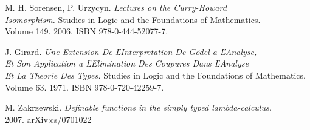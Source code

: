\documentclass{article}[12pt]
\begin{document}
\begin{thebibliography}{}
    M. H. Sorensen, P. Urzycyn. \textit{Lectures on the Curry-Howard \\ Isomorphism.}
    Studies in Logic and the Foundations of Mathematics. \\ Volume 149. 2006. ISBN
    978-0-444-52077-7.

    J. Girard. \textit{Une Extension De ĽInterpretation De Gödel a ĽAnalyse, \\ Et Son Application  a ĽElimination Des Coupures Dans ĽAnalyse  \\ Et La Theorie Des Types.}
    Studies in Logic and the Foundations of Mathematics. Volume 63. 1971. ISBN 978-0-720-42259-7.

    M. Zakrzewski. \textit{Definable functions in the simply typed lambda-calculus.} \\ 2007.
    arXiv:cs/0701022
\end{thebibliography}
\end{document}
